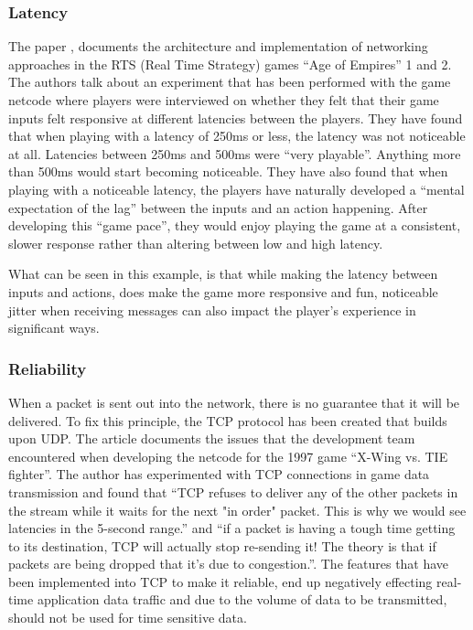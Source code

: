 \subsubsection{Latency}
The paper , documents the architecture and implementation of networking approaches in the RTS (Real Time Strategy) games ``Age of Empires'' 1 and 2. The authors talk about an experiment that has been performed with the game netcode where players were interviewed on whether they felt that their game inputs felt responsive at different latencies between the players. They have found that when playing with a latency of 250ms or less, the latency was not noticeable at all. Latencies between 250ms and 500ms were ``very playable''. Anything more than 500ms would start becoming noticeable. They have also found that when playing with a noticeable latency, the players have naturally developed a ``mental expectation of the lag'' between the inputs and an action happening. After developing this ``game pace'', they would enjoy playing the game at a consistent, slower response rather than altering between low and high latency.

What can be seen in this example, is that while making the latency between inputs and actions, does make the game more responsive and fun, noticeable jitter when receiving messages can also impact the player's experience in significant ways.


\subsubsection{Reliability}
When a packet is sent out into the network, there is no guarantee that it will be delivered. To fix this principle, the TCP protocol has been created that builds upon UDP. The article  documents the issues that the development team encountered when developing the netcode for the 1997 game ``X-Wing vs. TIE fighter''. The author has experimented with TCP connections in game data transmission and found that ``TCP refuses to deliver any of the other packets in the stream while it waits for the next "in order" packet. This is why we would see latencies in the 5-second range.'' and ``if a packet is having a tough time getting to its destination, TCP will actually stop re-sending it! The theory is that if packets are being dropped that it's due to congestion.''. The features that have been implemented into TCP to make it reliable, end up negatively effecting real-time application data traffic and due to the volume of data to be transmitted, should not be used for time sensitive data.


